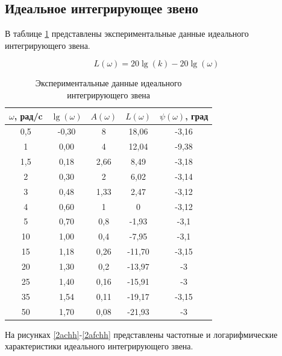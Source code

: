 \documentclass[a4paper, 12pt]{article}
\begin{document}
\newpage
\begin{center}
	\section{Идеальное интегрирующее звено}
\end{center}\par
В таблице \ref{tab:integr} представлены экспериментальные данные идеального интегрирующего звена.

\begin{equation}
	L(\omega) = 20\lg(k)-20\lg(\omega)
\end{equation}

\begin{table}[h]
	\centering
	\begin{threeparttable}
	\caption{Экспериментальные данные идеального интегрирующего звена}
	\label{tab:integr}
	\begin{tabular}{|c|c|c|c|c|}
		\hline
		$\omega$, рад/c   & $\lg(\omega)$   & $A(\omega)$ & $L(\omega)$   & $\psi(\omega)$, град   \\
		\hline
		0,5 & -0,30 & 8    & 18,06   & -3,16 \\
		\hline
		1   & 0,00  & 4    & 12,04   & -9,38 \\
		\hline
		1,5 & 0,18  & 2,66 & 8,49   & -3,18 \\
		\hline
		2   & 0,30  & 2    & 6,02    & -3,14 \\
		\hline
		3   & 0,48  & 1,33 & 2,47    & -3,12 \\
		\hline
		4   & 0,60  & 1    & 0              & -3,12 \\
		\hline
		5   & 0,70  & 0,8  & -1,93    & -3,1  \\
		\hline
		10  & 1,00  & 0,4  & -7,95   & -3,1  \\
		\hline
		15  & 1,18  & 0,26 & -11,70   & -3,15 \\
		\hline
		20  & 1,30  & 0,2  & -13,97   & -3    \\
		\hline
		25  & 1,40  & 0,16 & -15,91   & -3    \\
		\hline
		35  & 1,54  & 0,11 & -19,17    & -3,15 \\
		\hline
		50  & 1,70  & 0,08 & -21,93   & -3   \\
		\hline
	\end{tabular}
\end{threeparttable}
\end{table}

На рисунках \ref{2achh}-\ref{2afchh} представлены частотные и логарифмические характеристики идеального интегрирующего звена.
\end{document}
